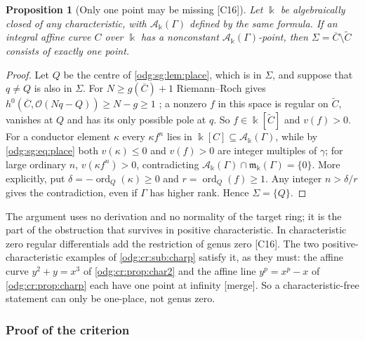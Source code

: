 \documentclass[11pt,oneside]{article}
\numberwithin{equation}{section}
\newtheorem{proposition}[proposition]{Proposition}
\theoremstyle{definition}
\theoremstyle{remark}
\newcommand{\src}[1]{\textup{\textsf{\small[#1]}}}
\newcommand{\mergetag}{\textup{\textsf{\small[merge]}}}
\newcommand{\crA}{\mathcal A_\Bbbk(\Gamma)}
\newcommand{\crm}{\mathfrak m_\Bbbk(\Gamma)}
\begin{document}
\begin{proposition}[Only one point may be missing \src{C16}]\label{odg:sg:prop:oneplace}
Let $\Bbbk$ be algebraically closed of any characteristic, with $\crA$ defined by the same
formula. If an integral affine curve $C$ over $\Bbbk$ has a nonconstant $\crA$-point, then
$\Sigma=\overline C\setminus\widetilde C$ consists of exactly one point.
\end{proposition}
\begin{proof}
Let $Q$ be the centre of \cref{odg:sg:lem:place}, which is in $\Sigma$, and suppose that
$q\ne Q$ is also in $\Sigma$. For $N\ge g(\overline C)+1$ Riemann--Roch gives
$h^0(\overline C,\mathcal O(Nq-Q))\ge N-g\ge1$ \cite{StacksRR}; a nonzero $f$ in this space
is regular on $\widetilde C$, vanishes at $Q$ and has its only possible pole at $q$. So
$f\in\Bbbk[\widetilde C]$ and $v(f)>0$. For a conductor element $\kappa$ every $\kappa f^n$
lies in $\Bbbk[C]\subseteq\crA$, while by \eqref{odg:sg:eq:place} both $v(\kappa)\le0$ and
$v(f)>0$ are integer multiples of $\gamma$; for large ordinary $n$, $v(\kappa f^n)>0$,
contradicting $\crA\cap\crm=\{0\}$. More explicitly, put
$\delta=-\operatorname{ord}_Q(\kappa)\ge0$ and
$r=\operatorname{ord}_Q(f)\ge1$. Any integer $n>\delta/r$ gives the
contradiction, even if $\Gamma$ has higher rank. Hence $\Sigma=\{Q\}$.
\end{proof}

The argument uses no derivation and no normality of the target ring; it is the part of
the obstruction that survives in positive characteristic. In characteristic zero
regular differentials add the restriction of genus zero \src{C16}. The two
positive-characteristic examples of \cref{odg:cr:sub:charp} satisfy it, as they must: the
affine curve $y^2+y=x^3$ of \cref{odg:cr:prop:char2} and the affine line $y^p=x^p-x$ of
\cref{odg:cr:prop:charp} each have one point at infinity \mergetag. So a
characteristic-free statement can only be one-place, not genus zero.

\subsubsection{Proof of the criterion}\label{odg:sg:sub:proof}
\end{document}

